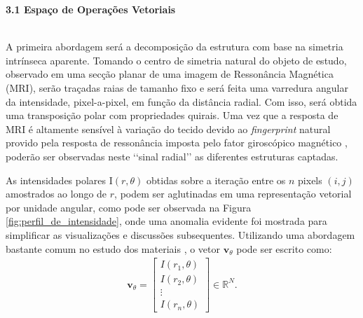 \documentclass[a4paper, 12pt]{report}
\begin{document}
$\frac{}{}$\\
\begin{Large}
	\textbf{3.1 Espaço de Operações Vetoriais}
\end{Large}
$\frac{}{}$\\

A primeira abordagem será a decomposição da estrutura com base na simetria intrínseca aparente. Tomando o centro de simetria natural do objeto de estudo, observado em uma secção planar de uma imagem de Ressonância Magnética (MRI), serão traçadas raias de tamanho fixo e será feita uma varredura angular da intensidade, pixel-a-pixel, em função da distância radial. Com isso, será obtida uma transposição polar com propriedades quirais. Uma vez que a resposta de MRI é altamente sensível à variação do tecido devido ao \textit{fingerprint} natural provido pela resposta de ressonância imposta pelo fator giroscópico magnético \cite{Slichter}, poderão ser observadas neste {\lq\lq}sinal radial{\rq\rq} as diferentes estruturas captadas.

As intensidades polares $\text{I}(r,\theta)$ obtidas sobre a iteração entre os $n$ pixels $(i,j)$ amostrados ao longo de $r$, podem ser aglutinadas em uma representação vetorial por unidade angular, como pode ser observada na Figura \ref{fig:perfil_de_intensidade}, onde uma anomalia evidente foi mostrada para simplificar as visualizações e discussões subsequentes. Utilizando uma abordagem bastante comum no estudo dos materiais \cite{Kittel1965}, o vetor $\mathbf{v}_\theta$ pode ser escrito como:
\begin{align}
	\mathbf{v}_\theta = \begin{bmatrix} I(r_1, \theta) \\ I(r_2, \theta) \\ \vdots \\ I(r_n, \theta) \end{bmatrix} \in \mathbb{R}^N.
	\label{eq:v}
\end{align} 
\end{document}

